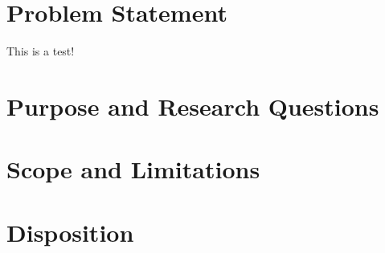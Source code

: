 \section{Problem Statement}

This is a test! \cite{DECAS}


\section{Purpose and Research Questions}

\section{Scope and Limitations}

\section{Disposition}